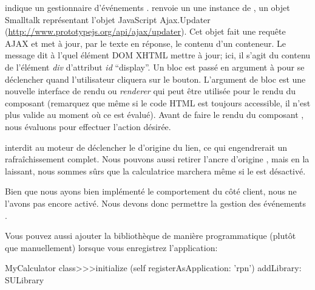 \documentclass[a4paper,10pt,twoside]{book}
\begin{document}
 indique un gestionnaire d'événements
\mbox{\ind{\jscript{}}.}
 renvoie un \updater \ie une instance de
, un objet Smalltalk représentant l'objet JavaScript
Ajax.Updater (\url{http://www.prototypejs.org/api/ajax/updater}).
Cet objet fait une requête AJAX et met à jour, par le texte en
réponse, le contenu d'un conteneur.
Le message  dit à l'\updater quel élément DOM XHTML mettre à jour; ici,
il s'agit du contenu de l'élément \emph{div} d'attribut \emph{id}
``display''.
Un bloc est passé en argument à  pour se déclencher
quand l'utilisateur cliquera sur le bouton.
L'argument de bloc  est une nouvelle interface de rendu ou
  \emph{renderer} qui peut être utilisée pour le rendu du composant
(remarquez que même si le code HTML est toujours accessible,
  il n'est plus valide au moment où ce \callback est évalué).
Avant de faire le rendu du composant , nous évaluons
 pour effectuer l'action désirée.

 interdit au moteur \jscript de déclencher le
\callback d'origine du lien, ce qui engendrerait un rafraîchissement
complet. %
Nous pouvons aussi retirer l'ancre d'origine , mais en
la laissant, nous sommes sûrs que la calculatrice marchera même si le
\jscript est désactivé.


Bien que nous ayons bien implémenté le comportement du côté client,
nous ne l'avons pas encore activé.
Nous devons donc permettre la gestion des événements \jscript.


Vous pouvez aussi ajouter la bibliothèque de manière programmatique
(plutôt que manuellement) lorsque vous enregistrez l'application:
\begin{code}{}
MyCalculator class>>>initialize
	(self registerAsApplication: 'rpn')
		addLibrary: SULibrary
\end{code}
\end{document}
